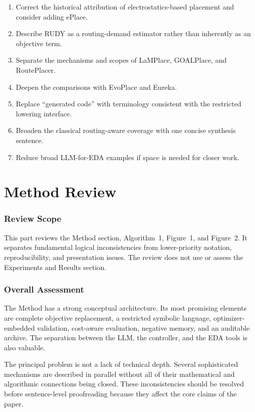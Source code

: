 \documentclass[11pt]{article}
\begin{document}
\begin{enumerate}
  \item Correct the historical attribution of electrostatics-based placement
  and consider adding ePlace.
  \item Describe RUDY as a routing-demand estimator rather than inherently as
  an objective term.
  \item Separate the mechanisms and scopes of LaMPlace, GOALPlace, and
  RoutePlacer.
  \item Deepen the comparisons with EvoPlace and Eureka.
  \item Replace ``generated code'' with terminology consistent with the
  restricted lowering interface.
  \item Broaden the classical routing-aware coverage with one concise synthesis
  sentence.
  \item Reduce broad LLM-for-EDA examples if space is needed for closer work.
\end{enumerate}

\clearpage
\part{Method Review}

\section{Review Scope}

This part reviews the Method section, Algorithm~1, Figure~1, and Figure~2. It
separates fundamental logical inconsistencies from lower-priority notation,
reproducibility, and presentation issues. The review does not use or assess the
Experiments and Results section.

\section{Overall Assessment}

The Method has a strong conceptual architecture. Its most promising elements
are complete objective replacement, a restricted symbolic language,
optimizer-embedded validation, cost-aware evaluation, negative memory, and an
auditable archive. The separation between the LLM, the controller, and the EDA
tools is also valuable.

The principal problem is not a lack of technical depth. Several sophisticated
mechanisms are described in parallel without all of their mathematical and
algorithmic connections being closed. These inconsistencies should be resolved
before sentence-level proofreading because they affect the core claims of the
paper.
\end{document}

